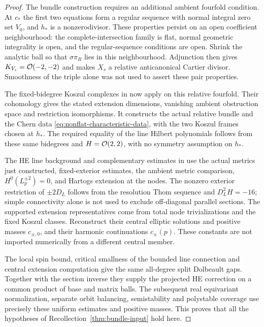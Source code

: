 \begin{proof}
The bundle construction requires an additional ambient
fourfold condition. At $c_*$ the first two equations form
a regular sequence with normal integral zero set $V_0$,
and $h_*$ is a nonzerodivisor. These properties persist on
an open coefficient neighbourhood: the complete-intersection
family is flat, normal geometric integrality is open, and
the regular-sequence conditions are open. Shrink the analytic
ball so that $\sigma\pi_R$ lies in this neighbourhood.
Adjunction then gives $K_{V_s}=\mathcal O(-2,-2)$ and makes $X_s$
a relative anticanonical Cartier divisor. Smoothness of the
triple alone was not used to assert these pair properties.

The fixed-bidegree Koszul complexes in
\cite[Section~2]{W_HYM} now apply on this relative fourfold.
Their cohomology gives the stated extension dimensions,
vanishing ambient obstruction space and restriction
isomorphisms. It constructs the actual relative bundle and
the Chern data \eqref{eq:nonflat-characteristic-data}, with
the two Koszul frames chosen at $h_*$. The required equality
of the line Hilbert polynomials follows from these same
bidegrees and $H=\mathcal O(2,2)$, with no symmetry assumption on $h_*$.

The HE line background and complementary estimates in
\cite[Sections~3--5]{W_HYM} use the actual metrics just
constructed, fixed-exterior estimates, the ambient metric
comparison, $H^0(L_p^{\pm2})=0$, and Hartogs extension at
the nodes. The nonzero exterior restriction of $\pm2D_L$
follows from the resolution Thom sequence and $D_L^2H=-16$;
simple connectivity alone is not used to exclude off-diagonal
parallel sections. The supported extension representatives
come from total node trivializations and the fixed Koszul
classes. Reconstruct their central elliptic solutions and
positive masses $c_{\pm,0}$, and their harmonic continuations
$c_\pm(p)$. These constants are not imported numerically
from a different central member.

The local spin bound, critical smallness of the bounded
line connection and central extension computation give the
same all-degree split Dolbeault gaps. Together with the
section inverse they supply the projected HE correction
on a common product of base and matrix balls. The subsequent
real equivariant normalization, separate orbit balancing,
semistability and polystable coverage use precisely these
uniform estimates and positive masses. This proves that all
the hypotheses of Recollection~\ref{thm:bundle-input} hold here.


\end{proof}
